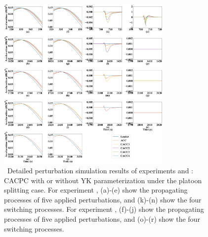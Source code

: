 \documentclass[journal]{IEEEtran}
\begin{document}
\begin{figure}
  \centering
  \includegraphics[width=8.5cm]{figs/split_detail.png}
  \caption{~Detailed perturbation simulation results of experiments \uppercase\expandafter{} and \uppercase\expandafter{}: CACPC with or without YK parameterization under the platoon splitting case. For experiment \uppercase\expandafter{}, (a)-(e) show the propagating processes of five applied perturbations, and (k)-(n) show the four switching processes. For experiment \uppercase\expandafter{}, (f)-(j) show the propagating processes of five applied perturbations, and (o)-(r) show the four switching processes.}
  \label{new4}
\end{figure}



\end{document}
